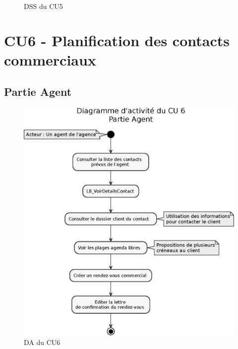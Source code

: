 \begin{figure}[H]
\noindent{}
\caption{DSS du CU5}
\end{figure}


\section{CU6 - Planification des contacts commerciaux}

\subsection{Partie Agent}
\begin{figure}[H]
\centering
\includegraphics[width=\textwidth]{figures/eps/DA_CU6_partieAgent.eps}
\caption{DA du CU6}
\end{figure}

